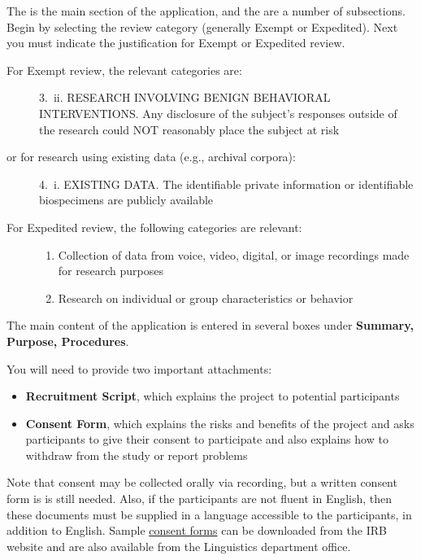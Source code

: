 \documentclass[
]{book}
\providecommand{\tightlist}{%
  \setlength{\itemsep}{0pt}\setlength{\parskip}{0pt}}
\begin{document}
The is the main section of the application, and the are a number of subsections. Begin by selecting the review category (generally Exempt or Expedited). Next you must indicate the justification for Exempt or Expedited review.

\begin{description}
\item[For Exempt review, the relevant categories are:]
3.~ii. RESEARCH INVOLVING BENIGN BEHAVIORAL INTERVENTIONS. Any disclosure of the subject's responses outside of the research could NOT reasonably place the subject at risk
\item[or for research using existing data (e.g., archival corpora):]
4.~i. EXISTING DATA. The identifiable private information or identifiable biospecimens are publicly available
\item[For Expedited review, the following categories are relevant:]
\hfill
\begin{enumerate}
\def\labelenumi{\arabic{enumi}.}
\setcounter{enumi}{5}
\tightlist
\item
  Collection of data from voice, video, digital, or image recordings made for research purposes
\item
  Research on individual or group characteristics or behavior
\end{enumerate}
\end{description}

The main content of the application is entered in several boxes under \textbf{Summary, Purpose, Procedures}.

You will need to provide two important attachments:

\begin{itemize}
\tightlist
\item
  \textbf{Recruitment Script}, which explains the project to potential participants
\item
  \textbf{Consent Form}, which explains the risks and benefits of the project and asks participants to give their consent to participate and also explains how to withdraw from the study or report problems
\end{itemize}

Note that consent may be collected orally via recording, but a written consent form is is still needed. Also, if the participants are not fluent in English, then these documents must be supplied in a language accessible to the participants, in addition to English. Sample \href{https://research.hawaii.edu/orc/human-studies/forms/\#templates}{consent forms} can be downloaded from the IRB website and are also available from the Linguistics department office.
\end{document}
